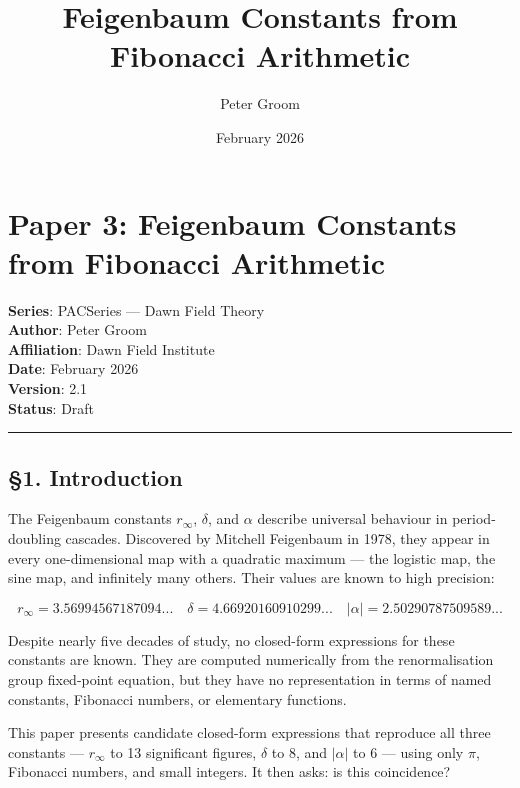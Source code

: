 \documentclass[
  11pt,
  a4paper]{article}
\title{Feigenbaum Constants from Fibonacci Arithmetic}
\author{Peter Groom}
\date{February 2026}
\begin{document}
\maketitle

\renewcommand*\contentsname{Contents}
{
\setcounter{tocdepth}{3}
\tableofcontents
}
\section{Paper 3: Feigenbaum Constants from Fibonacci
Arithmetic}\label{paper-3-feigenbaum-constants-from-fibonacci-arithmetic}

\textbf{Series}: PACSeries --- Dawn Field Theory\\
\textbf{Author}: Peter Groom\\
\textbf{Affiliation}: Dawn Field Institute\\
\textbf{Date}: February 2026\\
\textbf{Version}: 2.1\\
\textbf{Status}: Draft

\begin{center}\rule{0.5\linewidth}{0.5pt}\end{center}

\subsection{§1. Introduction}\label{introduction}

The Feigenbaum constants \(r_\infty\), \(\delta\), and \(\alpha\)
describe universal behaviour in period-doubling cascades. Discovered by
Mitchell Feigenbaum in 1978, they appear in every one-dimensional map
with a quadratic maximum --- the logistic map, the sine map, and
infinitely many others. Their values are known to high precision:

\[r_\infty = 3.56994567187094...\quad \delta = 4.66920160910299...\quad |\alpha| = 2.50290787509589...\]

Despite nearly five decades of study, no closed-form expressions for
these constants are known. They are computed numerically from the
renormalisation group fixed-point equation, but they have no
representation in terms of named constants, Fibonacci numbers, or
elementary functions.

This paper presents candidate closed-form expressions that reproduce all
three constants --- \(r_\infty\) to 13 significant figures, \(\delta\)
to 8, and \(|\alpha|\) to 6 --- using only \(\pi\), Fibonacci numbers,
and small integers. It then asks: is this coincidence?
\end{document}

